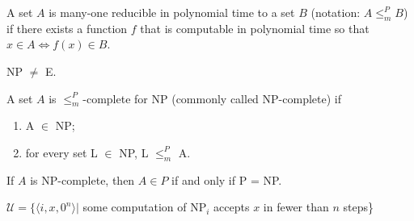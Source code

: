  A set $A$ is many-one reducible in polynomial time to a
set $B$
(notation: $A \le^P_m B$) if there exists a function $f$ that is computable
in polynomial time so that $x \in A \Leftrightarrow f(x) \in B$.

 NP $\ne$ E.

 A set $A$ is $\le^P_m$-complete for NP (commonly
called NP-complete) if
\begin{enumerate}
  \item A $\in$ NP;
  \item for every set L $\in$ NP, L $\le^P_m$ A.
\end{enumerate}

 If $A$ is NP-complete, then $A \in P$ if and only if P =
NP.

 $\mathscr{U} = \{\langle i, x, 0^n \rangle |$ some
computation of NP$_i$ accepts $x$ in fewer than $n$ steps\}
